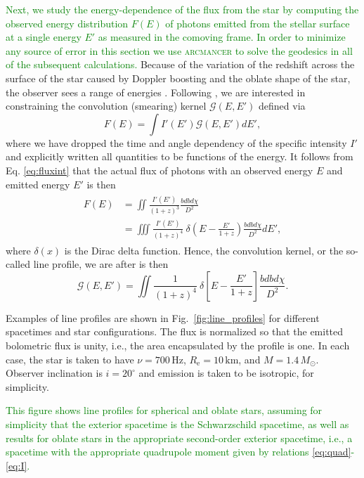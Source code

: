\documentclass{aa}
\newcommand{\be}{\begin{equation}}
\newcommand{\ee}{\end{equation}}
\newcommand{\refe}[1]{\textcolor{green}{{#1}}}
\newcommand{\refedel}[1]{}
\newcommand{\sch}{Schwarzschild }
\newcommand{\Msun}{\ensuremath{M_{\odot}}}
\begin{document}
\refe{Next, we study the energy-dependence of the flux from the star by computing the observed energy distribution $F(E)$ of photons emitted from the stellar surface at a single energy $E'$ as measured in the comoving frame.}
\refe{In order to minimize any source of error in this section we use \textsc{arcmancer} to solve the geodesics in all of the subsequent calculations.}
Because of the variation of the redshift across the surface of the star caused by Doppler boosting and the oblate shape of the star, the observer sees a range of energies \citep{OP03,BML06,CMB06}.
Following \citealt{Baubock15}, we are interested in constraining the convolution (smearing) kernel $\mathcal{G}(E,E')$ defined via
\be
F(E) = \int I'(E') \mathcal{G}(E,E') dE',
\ee
where we have dropped the time and angle dependency of the specific intensity $I'$ and explicitly written all quantities to be functions of the energy.
It follows from Eq. \eqref{eq:fluxint} that the actual flux of photons with an observed energy $E$ and emitted energy $E'$ is then
\begin{align}\begin{split}
    F(E) &= \iint \frac{ I'(E') }{ (1+z)^3 } \frac{bdb d\chi}{D^2} \\
         &= \iiint \frac{I'(E') }{(1+z)^4} ~ \delta \left( E - \frac{E'}{1+z} \right)  \frac{bdb d\chi}{D^2} dE',
\end{split}\end{align}
where $\delta(x)$ is the Dirac delta function.
Hence, the convolution kernel, or the so-called line profile, we are after is then 
\be
\mathcal{G}(E,E') =  \iint \frac{1}{(1+z)^4} ~\delta \left[E - \frac{E'}{1+z} \right]  \frac{bdb d\chi}{D^2}.
\ee

Examples of line profiles are shown in Fig.~\ref{fig:line_profiles} for different spacetimes and star configurations.
The flux is normalized so that the emitted bolometric flux is unity, i.e., the area encapsulated by the profile is one.
In each case, the star is taken to have $\nu = 700\,\mathrm{Hz}$, $R_{\mathrm{e}} = 10\,\mathrm{km}$, and $M=1.4\,\Msun$.
Observer inclination is $i=20^{\circ}$ and emission is taken to be isotropic, for simplicity.
\refedel{We consider a \sch spacetime for spherical and oblate stars, with radius given by Eq.~\eqref{eq:radf}, in addition to a full second-order spacetime with quadrupole moments and an oblate neutron star surface.}
\refe{This figure shows line profiles for spherical and oblate stars, assuming for simplicity that the exterior spacetime is the Schwarzschild spacetime, as well as results for oblate stars in the appropriate second-order exterior spacetime, 
i.e., a spacetime with the appropriate quadrupole moment given by relations \eqref{eq:quad}-\eqref{eq:I}.
}
\end{document}
